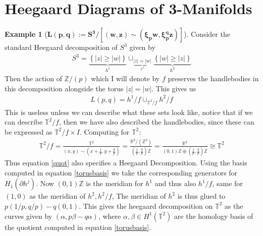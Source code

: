 \documentclass[10.5pt]{article}
\theoremstyle{definition}
\newtheorem{example}{Example}
\numberwithin{proposition}{subsection}
\numberwithin{pb}{subsection}
\newcommand{\set}[1]{\left\{#1\right\}}
\newcommand{\abs}[1]{\left\vert#1\right\vert}
\begin{document}
    \section{Heegaard Diagrams of 3-Manifolds}

    \begin{example}[\(\mathbf{L(p,q) := S^3/[(w,z) \sim (\xi_p w, \xi_p^q z)]}\)]

        Consider the standard Heegaard decomposition of \(S^3\) given by 
        \begin{align}
            S^3 = \underbrace{\set{\abs{z} \geq \abs{w}}}_{h^1} \cup_{\underbrace{\abs{z} = \abs{w}}_{\mathbb{T}^2}} \underbrace{\set{\abs{w} \geq \abs{z}}}_{h^2}
        \end{align}
        Then the action of \(\mathbb{Z}/(p)\) which I will denote by \(f\) preserves the handlebodies in this decomposition alongside the torus \(\abs{z} = \abs{w}\). This gives us
        \begin{align}
            L(p,q) = h^1/f \cup_{\mathbb{T}^2/f} h^2/f \label{quot}
        \end{align}
        This is useless unless we can describe what these sets look like, notice that if we can describe \(\mathbb{T}^2/f\), then we have also described the handlebodies, since these can be expressed as \(\mathbb{T}^2/f \times I\). Computing for \(\mathbb{T}^2\):
        \begin{align}
            \mathbb{T}^2/f = \frac{\mathbb{T}^2}{(x,y) \sim \left(x + \frac{1}{p},y+\frac{q}{p}\right)} = \frac{\mathbb{R}^2/(\mathbb{Z}^2)}{(\frac{1}{p},\frac{q}{p})\mathbb{Z}} = \frac{\mathbb{R}^2}{(0,1)\mathbb{Z} \oplus (\frac{1}{p},\frac{q}{p})\mathbb{Z}} \cong \mathbb{T}^2 \label{torusbasis}
        \end{align}
        Thus equation \eqref{quot} also specifies a Heegaard Decomposition. Using the basis computed in equation \eqref{torusbasis} we take the corresponding generators for \(H_1(\partial h^j)\). Now \((0,1)\mathbb{Z}\) is the meridian for \(h^1\) and thus also \(h^1/f\), same for \((1,0)\) as the meridian of \(h^2, h^2/f\), The meridian of \(h^2\) is thus glued to \(p(1/p,q/p) - q(0,1)\). This gives the heegaard decomposition
        on \(\mathbb{T}^2\) as the curves given by \((\alpha, p\beta - q\alpha)\), where \(\alpha,\beta \in H^1(\mathbb{T}^2)\) are the homology basis of the quotient computed in equation \eqref{torusbasis}.
    \end{example}
\end{document}
